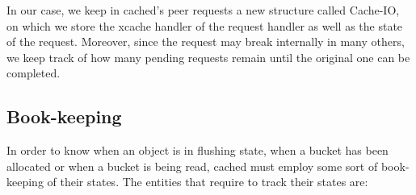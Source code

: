 In our case, we keep in cached's peer requests a new structure called Cache-IO, 
on which we store the xcache handler of the request handler as well as the 
state of the request. Moreover, since the request may break internally in many 
others, we keep track of how many pending requests remain until the original 
one can be completed.

\subsection{Book-keeping}

In order to know when an object is in flushing state, when a bucket has been 
allocated or when a bucket is being read, cached must employ some sort of 
book-keeping of their states. The entities that require to track their states 
are:

